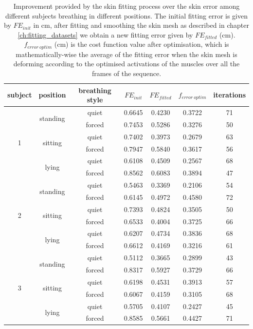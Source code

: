 \begin{table}
\begin{center}
\begin{tabular}{|c|c|c|c|c|c|c|}
\hline
subject & position & breathing style & $FE_{init}$ & $FE_{fitted}$ & $f_{error~optim}$ & iterations\\ 
\hline
\hline

 \multirow{6}{*}{1} & \multirow{2}{*}{standing} & quiet & 0.6645 & 0.4230 & 0.3722 & 71\\ 
 & & forced & 0.7453 & 0.5286 & 0.3276 & 50\\ \cline{2-7}
 & \multirow{2}{*}{sitting} & quiet & 0.7402 & 0.3973 & 0.2679 & 63\\ 
 & & forced & 0.7947 & 0.5840 & 0.3617 & 56\\ \cline{2-7}
 & \multirow{2}{*}{lying} & quiet & 0.6108 & 0.4509 & 0.2567 & 68\\ 
 & & forced & 0.8562 & 0.6083 & 0.3894 & 47\\ \hline \hline
 
 \multirow{6}{*}{2} & \multirow{2}{*}{standing} & quiet & 0.5463 & 0.3369 & 0.2106 & 54\\ 
 & & forced & 0.6145 & 0.4972 & 0.4580 & 72\\ \cline{2-7}
 & \multirow{2}{*}{sitting} & quiet & 0.7393 & 0.4824 & 0.3505 & 50\\ 
 & & forced & 0.6533 & 0.4004 & 0.3725 & 66\\ \cline{2-7}
 & \multirow{2}{*}{lying} & quiet & 0.6207 & 0.4734 & 0.3836 & 68\\ 
 & & forced & 0.6612 & 0.4169 & 0.3216 & 61\\ \hline \hline
 
 \multirow{6}{*}{3} & \multirow{2}{*}{standing} & quiet & 0.5112 & 0.3665 & 0.2899 & 43\\ 
 & & forced & 0.8317 & 0.5927 & 0.3729 & 66\\ \cline{2-7}
 & \multirow{2}{*}{sitting} & quiet & 0.6198 & 0.4531 & 0.3913 & 57\\ 
 & & forced & 0.6067 & 0.4159 & 0.3105 & 68\\ \cline{2-7}
 & \multirow{2}{*}{lying} & quiet & 0.5705 & 0.4107 & 0.2427 & 45\\ 
 & & forced & 0.8585 & 0.5661 & 0.4427 & 71\\ 
 
\hline
\end{tabular}
\end{center}
\caption[Improvement provided by the skin fitting process over the skin error]{\label{tab:optim_res}Improvement provided by the skin fitting process over the skin error among different subjects breathing in different positions. The initial fitting error is given by $FE_{init}$ in cm, after fitting and smoothing the skin mesh as described in chapter \ref{ch:fitting_datasets} we obtain a new fitting error given by $FE_{fitted}$ (cm). $f_{error~optim}$ (cm) is the cost function value after optimisation, which is mathematically-wise the average of the fitting error when the skin mesh is deforming according to the optimised activations of the muscles over all the frames of the sequence.}
\end{table}


